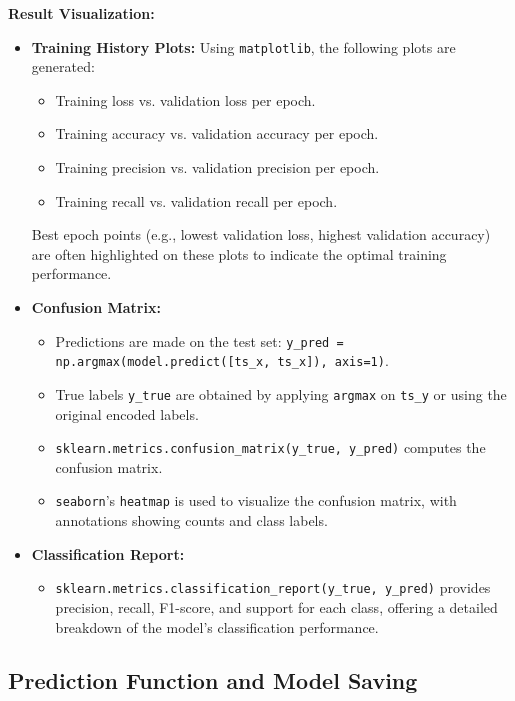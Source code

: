 \documentclass[twocolumn]{article}
\begin{document}
\vspace{0.5em}
\textbf{Result Visualization:}
\begin{itemize}
    \item \textbf{Training History Plots:} Using \texttt{matplotlib}, the following plots are generated:
    \begin{itemize}
        \item Training loss vs. validation loss per epoch.
        \item Training accuracy vs. validation accuracy per epoch.
        \item Training precision vs. validation precision per epoch.
        \item Training recall vs. validation recall per epoch.
    \end{itemize}
    Best epoch points (e.g., lowest validation loss, highest validation accuracy) are often highlighted on these plots to indicate the optimal training performance.
    
    \item \textbf{Confusion Matrix:}
    \begin{itemize}
        \item Predictions are made on the test set: \texttt{y\_pred = np.argmax(model.predict([ts\_x, ts\_x]), axis=1)}.
        \item True labels \texttt{y\_true} are obtained by applying \texttt{argmax} on \texttt{ts\_y} or using the original encoded labels.
        \item \texttt{sklearn.metrics.confusion\_matrix(y\_true, y\_pred)} computes the confusion matrix.
        \item \texttt{seaborn}'s \texttt{heatmap} is used to visualize the confusion matrix, with annotations showing counts and class labels.
    \end{itemize}
    
    \item \textbf{Classification Report:}
    \begin{itemize}
        \item \texttt{sklearn.metrics.classification\_report(y\_true, y\_pred)} provides precision, recall, F1-score, and support for each class, offering a detailed breakdown of the model's classification performance.
    \end{itemize}
\end{itemize}

\subsection{Prediction Function and Model Saving}
\end{document}
